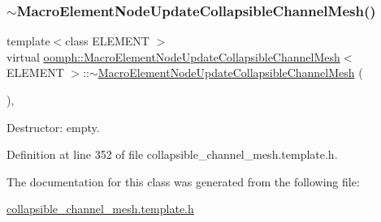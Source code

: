 \mbox{\label{classoomph_1_1MacroElementNodeUpdateCollapsibleChannelMesh_a284ffdb8ab08e5f817b14d69913f4496}} 
\subsubsection{\texorpdfstring{$\sim$\+Macro\+Element\+Node\+Update\+Collapsible\+Channel\+Mesh()}{~MacroElementNodeUpdateCollapsibleChannelMesh()}}
{\footnotesize\ttfamily template$<$class E\+L\+E\+M\+E\+NT $>$ \\
virtual \hyperlink{classoomph_1_1MacroElementNodeUpdateCollapsibleChannelMesh}{oomph\+::\+Macro\+Element\+Node\+Update\+Collapsible\+Channel\+Mesh}$<$ E\+L\+E\+M\+E\+NT $>$\+::$\sim$\hyperlink{classoomph_1_1MacroElementNodeUpdateCollapsibleChannelMesh}{Macro\+Element\+Node\+Update\+Collapsible\+Channel\+Mesh} (\begin{DoxyParamCaption}{ }\end{DoxyParamCaption})\hspace{0.3cm}{\ttfamily [inline]}, {\ttfamily [virtual]}}



Destructor\+: empty. 



Definition at line 352 of file collapsible\+\_\+channel\+\_\+mesh.\+template.\+h.



The documentation for this class was generated from the following file\+:\begin{DoxyCompactItemize}
\item 
\hyperlink{collapsible__channel__mesh_8template_8h}{collapsible\+\_\+channel\+\_\+mesh.\+template.\+h}\end{DoxyCompactItemize}
